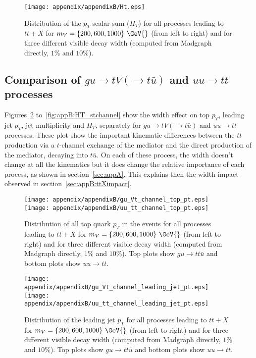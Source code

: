 \begin{figure}[!h!tpd]
  \centering
  \texttt{[image: appendix/appendixB/Ht.eps]}
  \caption{
      Distribution of the $p_T$ scalar sum ($H_T$) for all processes leading to $tt+X$
      for $m_V = \{200, 600, 1000\}~\GeV{}$ (from left to right) and for three different
      visible decay width (computed from Madgraph directly, $1\%$ and $10\%$).
  }   
  \label{fig:appB:HT}
\end{figure}


\clearpage
\subsection{Comparison of $gu \to tV(\to t\bar{u})$ and $uu\to tt$ processes}
\label{sec:appB:tt_vs_tV}

Figures~\ref{fig:appB:pTAllTops_stchannel} to~\ref{fig:appB:HT_stchannel} show the width effect on top $p_T$, leading jet $p_T$, jet multiplicity and $H_T$, 
separately for $gu \to tV(\to t\bar{u})$ and $uu \to tt$ processes. These plot show the important kinematic differences between the $tt$ production 
via a $t$-channel exchange of the mediator and the direct production of the mediator, decaying into $t\bar{u}$. On each of these process, the width doesn't
change at all the kinematics but it does change the relative importance of each process, as shown in section~\ref{sec:appA}. This explains then the
width impact observed in section~\ref{sec:appB:ttXimpact}.


\begin{figure}[!h!tpd]
  \centering
  \texttt{[image: appendix/appendixB/gu\_Vt\_channel\_top\_pt.eps]} \\
  \texttt{[image: appendix/appendixB/uu\_tt\_channel\_top\_pt.eps]}
  \caption{
      Distribution of all top quark $p_T$ in the events for all processes leading to $tt+X$
      for $m_V = \{200, 600, 1000\}~\GeV{}$ (from left to right) and for three different
      visible decay width (computed from Madgraph directly, $1\%$ and $10\%$). Top plots show $gu \to tt \bar{u}$ and bottom plots show $uu \to tt$.
  }   
  \label{fig:appB:pTAllTops_stchannel}
\end{figure}


\begin{figure}[!h!tpd]
  \centering
  \texttt{[image: appendix/appendixB/gu\_Vt\_channel\_leading\_jet\_pt.eps]}\\
  \texttt{[image: appendix/appendixB/uu\_tt\_channel\_leading\_jet\_pt.eps]}
  \caption{
      Distribution of the leading jet $p_T$ for all processes leading to $tt+X$
      for $m_V = \{200, 600, 1000\}~\GeV{}$ (from left to right) and for three different
      visible decay width (computed from Madgraph directly, $1\%$ and $10\%$). Top plots show $gu \to tt \bar{u}$ and bottom plots show $uu \to tt$.
  }   
  \label{fig:appB:Vmass}
\end{figure}


